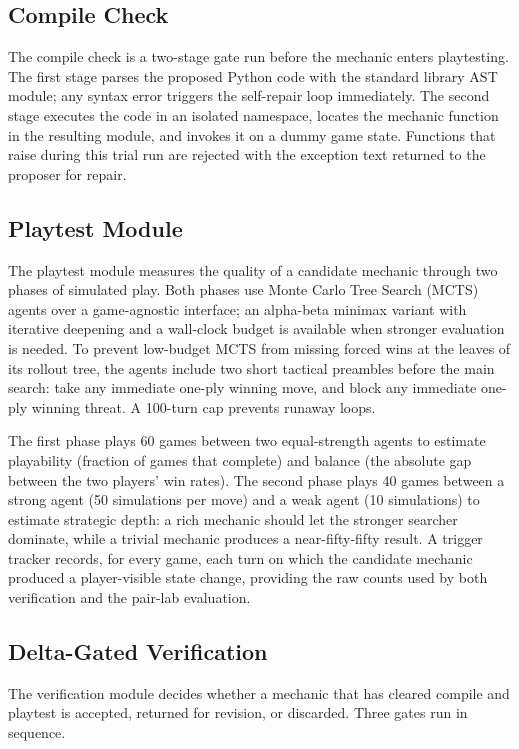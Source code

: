 \documentclass[conference]{IEEEtran}
\begin{document}
\subsection{Compile Check}

The compile check is a two-stage gate run before the mechanic enters playtesting. The first stage parses the proposed Python code with the standard library AST module; any syntax error triggers the self-repair loop immediately. The second stage executes the code in an isolated namespace, locates the mechanic function in the resulting module, and invokes it on a dummy game state. Functions that raise during this trial run are rejected with the exception text returned to the proposer for repair.

\subsection{Playtest Module}

The playtest module measures the quality of a candidate mechanic through two phases of simulated play. Both phases use Monte Carlo Tree Search (MCTS) agents over a game-agnostic interface; an alpha-beta minimax variant with iterative deepening and a wall-clock budget is available when stronger evaluation is needed. To prevent low-budget MCTS from missing forced wins at the leaves of its rollout tree, the agents include two short tactical preambles before the main search: take any immediate one-ply winning move, and block any immediate one-ply winning threat. A 100-turn cap prevents runaway loops.

The first phase plays 60 games between two equal-strength agents to estimate playability (fraction of games that complete) and balance (the absolute gap between the two players' win rates). The second phase plays 40 games between a strong agent (50 simulations per move) and a weak agent (10 simulations) to estimate strategic depth: a rich mechanic should let the stronger searcher dominate, while a trivial mechanic produces a near-fifty-fifty result. A trigger tracker records, for every game, each turn on which the candidate mechanic produced a player-visible state change, providing the raw counts used by both verification and the pair-lab evaluation.

\subsection{Delta-Gated Verification}

The verification module decides whether a mechanic that has cleared compile and playtest is accepted, returned for revision, or discarded. Three gates run in sequence.
\end{document}
